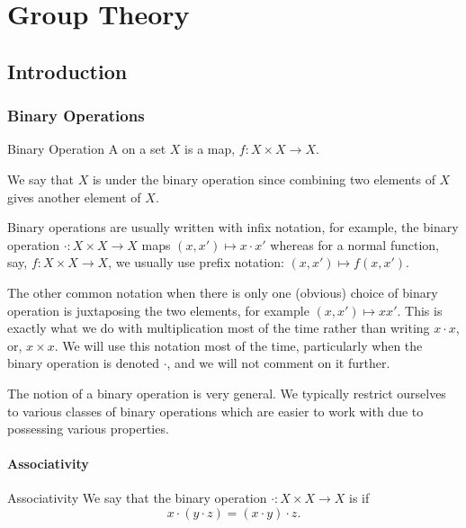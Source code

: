 \part{Group Theory}
\chapter{Introduction}
\section{Binary Operations}

\begin{dfn}{Binary Operation}{}
    A  on a set \(X\) is a map, \(f\colon X \times X \to X\).
    
    \begin{rmk}
        We say that \(X\) is  under the binary operation since combining two elements of \(X\) gives another element of \(X\).
    \end{rmk}
\end{dfn}

\begin{ntn}{}{}
    Binary operations are usually written with infix notation, for example, the binary operation \(\cdot \colon X \times X \to X\) maps \((x, x') \mapsto x \cdot x'\) whereas for a normal function, say, \(f\colon X \times X \to X\), we usually use prefix notation: \((x, x') \mapsto f(x, x')\).
    
    The other common notation when there is only one (obvious) choice of binary operation is juxtaposing the two elements, for example \((x, x') \mapsto xx'\).
    This is exactly what we do with multiplication most of the time rather than writing \(x \cdot x\), or, \(x \times x\).
    We will use this notation most of the time, particularly when the binary operation is denoted \(\cdot\), and we will not comment on it further.
\end{ntn}

The notion of a binary operation is very general.
We typically restrict ourselves to various classes of binary operations which are easier to work with due to possessing various properties.

\subsection{Associativity}
\begin{dfn}{Associativity}{}
    We say that the binary operation \(\cdot\colon X \times X \to X\) is  if
    \begin{equation}
        x \cdot (y \cdot z) = (x \cdot y) \cdot z.
    \end{equation}
\end{dfn}

